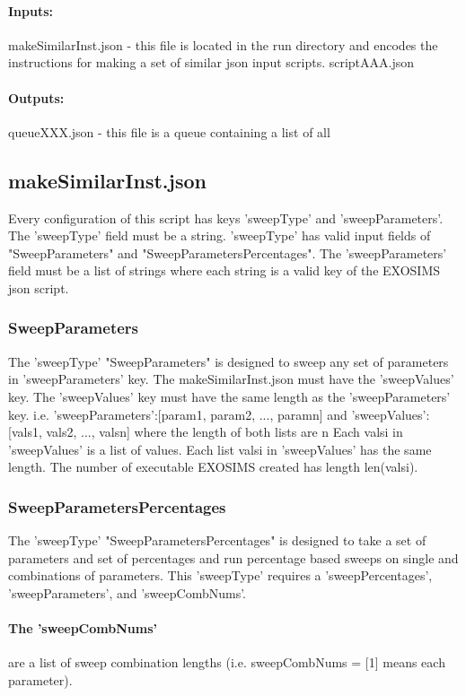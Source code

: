 \documentclass[12pt]{article}
\begin{document}
\paragraph{Inputs:}
makeSimilarInst.json - this file is located in the run directory and encodes the instructions for making a set of similar json input scripts.
scriptAAA.json
\paragraph{Outputs:}
queueXXX.json - this file is a queue containing a list of all


\subsection{makeSimilarInst.json}
Every configuration of this script has keys
'sweepType' and 'sweepParameters'.
The 'sweepType' field must be a string.
'sweepType' has valid input fields of "SweepParameters" and "SweepParametersPercentages".
The 'sweepParameters' field must be a list of strings where each string is a valid key of the EXOSIMS json script.

\subsubsection{SweepParameters}
The 'sweepType' "SweepParameters" is designed to sweep any set of parameters in 'sweepParameters' key.
The makeSimilarInst.json must have the 'sweepValues' key.
The 'sweepValues' key must have the same length as the 'sweepParameters' key.
i.e. 'sweepParameters':[param1, param2, ..., paramn] and 'sweepValues':[vals1, vals2, ..., valsn] where the length of both lists are n
Each valsi in 'sweepValues' is a list of values.
Each list valsi in 'sweepValues' has the same length.
The number of executable EXOSIMS created has length len(valsi).

\subsubsection{SweepParametersPercentages}
The 'sweepType' "SweepParametersPercentages" is designed to take a set of parameters and set of percentages and run percentage based sweeps on single and combinations of parameters.
This 'sweepType' requires a 'sweepPercentages', 'sweepParameters', and 'sweepCombNums'.

\paragraph{The 'sweepCombNums'} are a list of sweep combination lengths (i.e. sweepCombNums = [1] means each parameter).
\end{document}
